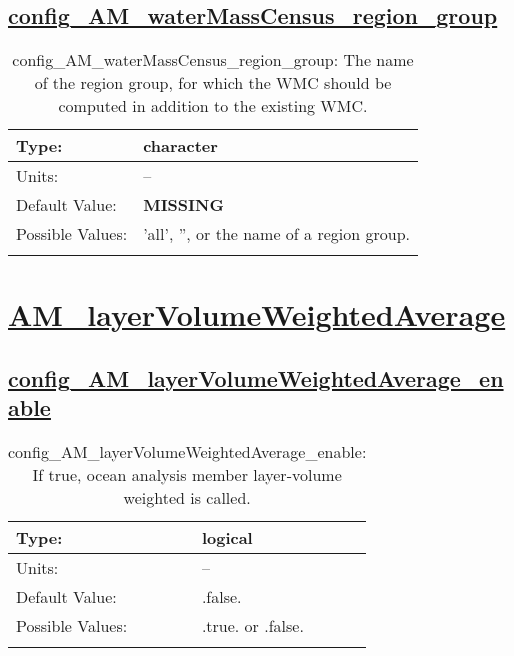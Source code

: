 \subsection[config\_AM\_waterMassCensus\_region\_group]{\hyperref[sec:nm_tab_AM_waterMassCensus]{config\_AM\_waterMassCensus\_region\_group}}
\label{subsec:nm_sec_config_AM_waterMassCensus_region_group}
\begin{center}
\begin{longtable}{| p{2.0in} || p{4.0in} |}
    \hline
    Type: & character \\
    \hline
    Units: & -- \\
    \hline
    Default Value: & {\bf \color{red} MISSING} \\
    \hline
    Possible Values: & 'all', '', or the name of a region group. \\
    \hline
    \caption{config\_AM\_waterMassCensus\_region\_group: The name of the region group, for which the WMC should be computed in addition to the existing WMC.}
\end{longtable}
\end{center}
\section[AM\_layerVolumeWeightedAverage]{\hyperref[sec:nm_tab_AM_layerVolumeWeightedAverage]{AM\_layerVolumeWeightedAverage}}
\label{sec:nm_sec_AM_layerVolumeWeightedAverage}
\subsection[config\_AM\_layerVolumeWeightedAverage\_enable]{\hyperref[sec:nm_tab_AM_layerVolumeWeightedAverage]{config\_AM\_layerVolumeWeightedAverage\_enable}}
\label{subsec:nm_sec_config_AM_layerVolumeWeightedAverage_enable}
\begin{center}
\begin{longtable}{| p{2.0in} || p{4.0in} |}
    \hline
    Type: & logical \\
    \hline
    Units: & -- \\
    \hline
    Default Value: & .false. \\
    \hline
    Possible Values: & .true. or .false. \\
    \hline
    \caption{config\_AM\_layerVolumeWeightedAverage\_enable: If true, ocean analysis member layer-volume weighted is called.}
\end{longtable}
\end{center}
